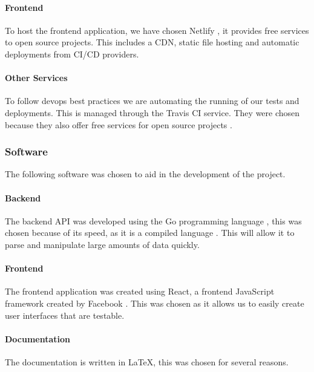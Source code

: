 \documentclass[a4paper,11pt]{article}
\begin{document}
\paragraph{Frontend}

To host the frontend application, we have chosen Netlify \autocite{netlify:6},
it provides free services to open source projects. This includes a CDN, static
file hosting and automatic deployments from CI/CD providers.

\paragraph{Other Services}

To follow devops best practices we are automating the running of our tests
and deployments. This is managed through the Travis CI service. They were
chosen because they also offer free services for open source projects
\autocite{trci:7}.

\subsubsection{Software}

The following software was chosen to aid in the development of the project.

\paragraph{Backend}

The backend API was developed using the Go programming language
\autocite{go:8}, this was chosen because of its speed, as it is a compiled
language \autocite{plural:9}. This will allow it to parse and manipulate large
amounts of data quickly.

\paragraph{Frontend}

The frontend application was created using React, a frontend JavaScript
framework created by Facebook \autocite{react:10}. This was chosen as it
allows us to easily create user interfaces that are testable.

\paragraph{Documentation}

The documentation is written in \LaTeX, this was chosen for several reasons.
\end{document}
